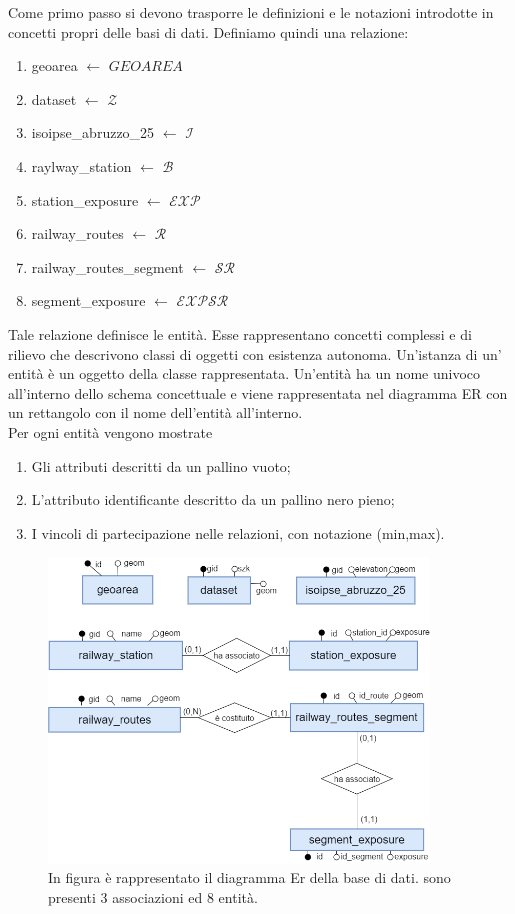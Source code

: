 Come primo passo si devono trasporre le definizioni e le notazioni introdotte in concetti propri delle basi di dati.
Definiamo quindi una relazione: 
\begin{enumerate}
	\item geoarea $\leftarrow$ $GEOAREA$
	\item dataset $\leftarrow$ $\mathcal{Z}$
	\item isoipse\_abruzzo\_25 $\leftarrow$ $\mathcal{I}$
	\item raylway\_station $\leftarrow$ $\mathcal{B}$
	\item station\_exposure $\leftarrow$ $\mathcal{EXP}$
	\item railway\_routes $\leftarrow$ $\mathcal{R}$
	\item railway\_routes\_segment $\leftarrow$ $\mathcal{SR}$
	\item segment\_exposure $\leftarrow$ $\mathcal{EXPSR}$
\end{enumerate}
Tale relazione definisce le entità. Esse rappresentano concetti complessi e di rilievo che descrivono classi di oggetti con esistenza autonoma. Un'istanza di un' entità è un oggetto della classe rappresentata. Un'entità ha un nome univoco all'interno dello schema concettuale e viene rappresentata nel diagramma ER con un rettangolo con il nome dell'entità all'interno. \\
Per ogni entità vengono mostrate
\begin{enumerate}
	\item Gli attributi descritti da un pallino vuoto;
	\item L'attributo identificante descritto da un pallino nero pieno;
	\item I vincoli di partecipazione nelle relazioni, con notazione (min,max).
\end{enumerate}


\begin{figure}[h]
	\centering
	\includegraphics[width=0.9\textwidth]{images/DiagrammaEr.png}
	\caption{In figura è rappresentato il diagramma Er della base di dati. sono presenti 3 associazioni ed 8 entità.}
	\label{fig:diagrammaER}
\end{figure}

